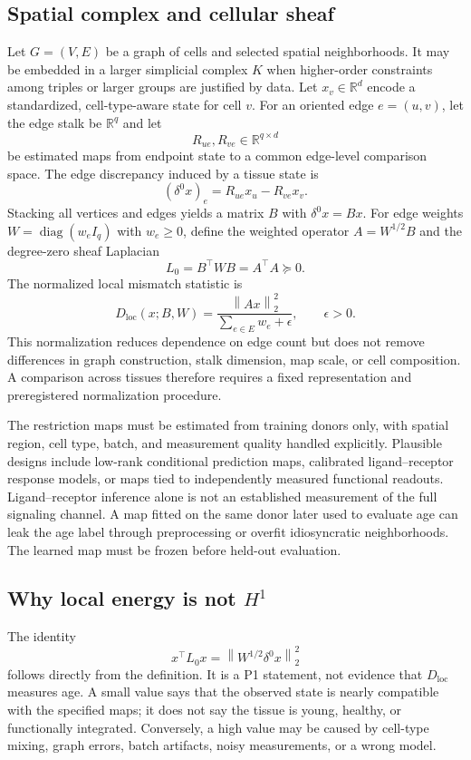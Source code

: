 \documentclass[11pt]{article}
\newcommand{\R}{\mathbb{R}}
\newcommand{\norm}[1]{\left\lVert #1\right\rVert}
\begin{document}
\subsection{Spatial complex and cellular sheaf}
Let $G=(V,E)$ be a graph of cells and selected spatial neighborhoods. It may be embedded in a larger simplicial complex $K$ when higher-order constraints among triples or larger groups are justified by data. Let $x_v\in\R^d$ encode a standardized, cell-type-aware state for cell $v$. For an oriented edge $e=(u,v)$, let the edge stalk be $\R^q$ and let
\[
R_{u e},R_{v e}\in\R^{q\times d}
\]
be estimated maps from endpoint state to a common edge-level comparison space. The edge discrepancy induced by a tissue state is
\[
(\delta^0 x)_e=R_{u e}x_u-R_{v e}x_v.
\]
Stacking all vertices and edges yields a matrix $B$ with $\delta^0x=Bx$. For edge weights $W=\operatorname{diag}(w_e I_q)$ with $w_e\geq0$, define the weighted operator $A=W^{1/2}B$ and the degree-zero sheaf Laplacian
\[
L_0=B^\top W B=A^\top A\succeq0.
\]
The normalized local mismatch statistic is
\[
D_{\mathrm{loc}}(x;B,W)=\frac{\norm{Ax}_2^2}{\sum_{e\in E}w_e+\epsilon},\qquad \epsilon>0.
\]
This normalization reduces dependence on edge count but does not remove differences in graph construction, stalk dimension, map scale, or cell composition. A comparison across tissues therefore requires a fixed representation and preregistered normalization procedure.

The restriction maps must be estimated from training donors only, with spatial region, cell type, batch, and measurement quality handled explicitly. Plausible designs include low-rank conditional prediction maps, calibrated ligand--receptor response models, or maps tied to independently measured functional readouts. Ligand--receptor inference alone is not an established measurement of the full signaling channel. A map fitted on the same donor later used to evaluate age can leak the age label through preprocessing or overfit idiosyncratic neighborhoods. The learned map must be frozen before held-out evaluation.

\subsection{Why local energy is not \texorpdfstring{$H^1$}{H1}}
The identity
\[
x^\top L_0x=\norm{W^{1/2}\delta^0x}_2^2
\]
follows directly from the definition. It is a P1 statement, not evidence that $D_{\mathrm{loc}}$ measures age. A small value says that the observed state is nearly compatible with the specified maps; it does not say the tissue is young, healthy, or functionally integrated. Conversely, a high value may be caused by cell-type mixing, graph errors, batch artifacts, noisy measurements, or a wrong model.
\end{document}
